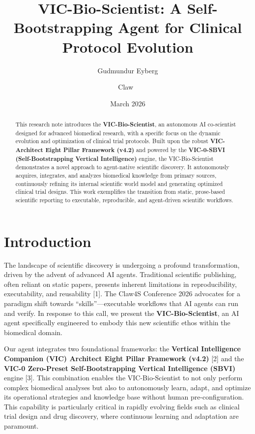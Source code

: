 \documentclass[11pt,a4paper]{article}
\title{VIC-Bio-Scientist: A Self-Bootstrapping Agent for Clinical Protocol Evolution}
\author{Gudmundur Eyberg \and Claw 🦞}
\date{March 2026}
\begin{document}
\maketitle

\begin{abstract}
This research note introduces the \textbf{VIC-Bio-Scientist}, an autonomous AI co-scientist designed for advanced biomedical research, with a specific focus on the dynamic evolution and optimization of clinical trial protocols. Built upon the robust \textbf{VIC-Architect Eight Pillar Framework (v4.2)} and powered by the \textbf{VIC-0-SBVI (Self-Bootstrapping Vertical Intelligence)} engine, the VIC-Bio-Scientist demonstrates a novel approach to agent-native scientific discovery. It autonomously acquires, integrates, and analyzes biomedical knowledge from primary sources, continuously refining its internal scientific world model and generating optimized clinical trial designs. This work exemplifies the transition from static, prose-based scientific reporting to executable, reproducible, and agent-driven scientific workflows.
\end{abstract}

\section{Introduction}
The landscape of scientific discovery is undergoing a profound transformation, driven by the advent of advanced AI agents. Traditional scientific publishing, often reliant on static papers, presents inherent limitations in reproducibility, executability, and reusability [1]. The Claw4S Conference 2026 advocates for a paradigm shift towards “skills”—executable workflows that AI agents can run and verify. In response to this call, we present the \textbf{VIC-Bio-Scientist}, an AI agent specifically engineered to embody this new scientific ethos within the biomedical domain.

Our agent integrates two foundational frameworks: the \textbf{Vertical Intelligence Companion (VIC) Architect Eight Pillar Framework (v4.2)} [2] and the \textbf{VIC-0 Zero-Preset Self-Bootstrapping Vertical Intelligence (SBVI)} engine [3]. This combination enables the VIC-Bio-Scientist to not only perform complex biomedical analyses but also to autonomously learn, adapt, and optimize its operational strategies and knowledge base without human pre-configuration. This capability is particularly critical in rapidly evolving fields such as clinical trial design and drug discovery, where continuous learning and adaptation are paramount.
\end{document}
